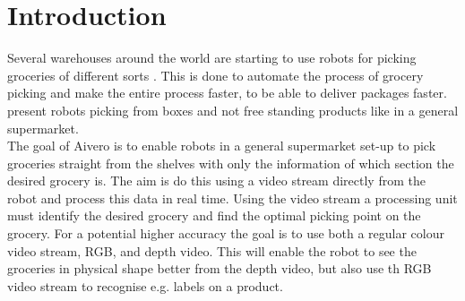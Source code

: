 \chapter{Introduction}\label{ch:intro}
Several warehouses around the world are starting to use robots for picking groceries of different sorts \citep{Olsen2018, Perez2018, Vincent2018}. This is done to automate the process of grocery picking and make the entire process faster, to be able to deliver packages faster. \cite{Olsen2018, Perez2018, Vincent2018} present robots picking from boxes and not free standing products like in a general supermarket.\\

The goal of Aivero is to enable robots in a general supermarket set-up to pick groceries straight from the shelves with only the information of which section the desired grocery is. The aim is do this using a video stream directly from the robot and process this data in real time. Using the video stream a processing unit must identify the desired grocery and find the optimal picking point on the grocery. For a potential higher accuracy the goal is to use both a regular colour video stream, RGB, and depth video. This will enable the robot to see the groceries in physical shape better from the depth video, but also use th RGB video stream to recognise e.g. labels on a product.